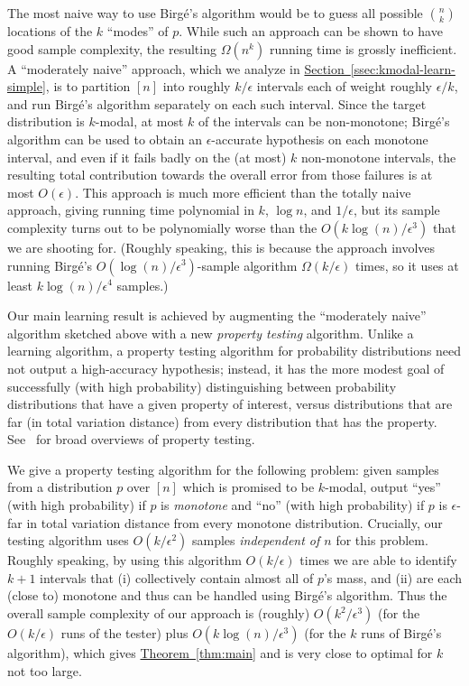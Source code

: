 \documentclass[10pt]{article}
\theoremstyle{definition}
\numberwithin{equation}{section}
\newcommand{\expref}[2]{\texorpdfstring{\hyperref[#2]{#1~\ref{#2}}}{#1~\ref{#2}}}
\newcommand{\eps}{\epsilon}
\begin{document}
The most naive way to use Birg\'{e}'s algorithm would be to guess all possible $\binom{n}{k}$ locations of the $k$ ``modes'' of $p$.  While such an approach can be shown to have good sample complexity, the resulting $\Omega(n^k)$ running time is grossly inefficient.  A ``moderately naive'' approach, which we analyze in \expref{Section}{ssec:kmodal-learn-simple}, is to partition $[n]$ into roughly $k/\eps$ intervals each of weight roughly $\eps/k$, and run Birg\'{e}'s algorithm separately on each such interval.  Since the target distribution is $k$-modal, at most $k$ of the intervals can be non-monotone; Birg\'{e}'s algorithm can be used to obtain an $\eps$-accurate hypothesis on each monotone interval, and even if it fails badly on the (at most) $k$ non-monotone intervals, the resulting total contribution towards the overall error from those failures is at most $O(\eps)$.  This approach is much more efficient than the totally naive approach, giving
running time polynomial in $k$, $\log n$, and $1/\eps$, but its sample complexity turns out to be polynomially worse
than the $O(k\log(n)/\eps^3)$ that we are shooting for.  (Roughly speaking, this is because the approach involves running Birg\'{e}'s $O(\log(n)/\eps^3)$-sample algorithm 
$ {\Omega}(k/\eps)$ times, so it uses at least $k\log(n)/\eps^4$ samples.)

Our main learning result is achieved by augmenting the ``moderately naive'' 
algorithm sketched above with a new \emph{property testing} algorithm.  
 {Unlike a learning algorithm, a property testing algorithm
for probability distributions need not output a high-accuracy hypothesis;
instead, it has the more modest goal of successfully (with high probability)
distinguishing between probability distributions that have a given property 
of interest, versus distributions that are far (in total variation distance)
from every distribution that has the property.  See~\cite{GGR98,
Ron:10FNTTCS, PropertyTestingICS} for broad overviews of property testing.}

We give a property testing algorithm for the following problem:  given
samples {from a distribution $p$ over $[n]$ which is promised to be
$k$-modal}, output ``yes'' (with high probability) if $p$ is 
\emph{monotone} and ``no'' (with high probability) if $p$ is
$\eps$-far {in total variation distance} 
from every monotone distribution.  
Crucially, our testing algorithm uses $O({k}/\eps^2)$ samples 
\emph{independent of $n$}
for this problem.  Roughly speaking, by using this algorithm $O(k/\eps)$ 
times we are able to identify
$k+1$ intervals that (i) collectively contain almost all of $p$'s mass, 
and (ii) are each (close to) monotone and thus can be handled using 
Birg\'{e}'s algorithm.  Thus the overall sample complexity of our approach is 
(roughly) ${O(k^2/\eps^3)}$ (for the $O(k/\eps)$
runs of the tester) plus $O(k\log(n)/\eps^3)$ (for the $k$ runs 
of Birg\'{e}'s algorithm), which gives \expref{Theorem}{thm:main} and is very 
close to optimal for $k$ not too large.
\end{document}
